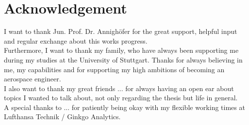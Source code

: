 \section{Acknowledgement}\label{sec:acknowledgement}
I want to thank Jun. Prof. Dr. Annighöfer for the great support, helpful input and regular exchange about this works progress.
\\
Furthermore, I want to thank my family, who have always been supporting me during my studies at the University of Stuttgart.
Thanks for always believing in me, my capabilities and for supporting my high ambitions of becoming an aerospace engineer.
\\
I also want to thank my great friends  ... for always having an open ear about topics I wanted to talk about, not only regarding the thesis but life in general.
\\
A special thanks to  ... for patiently being okay with my flexible working times at Lufthansa Technik / Ginkgo Analytics.